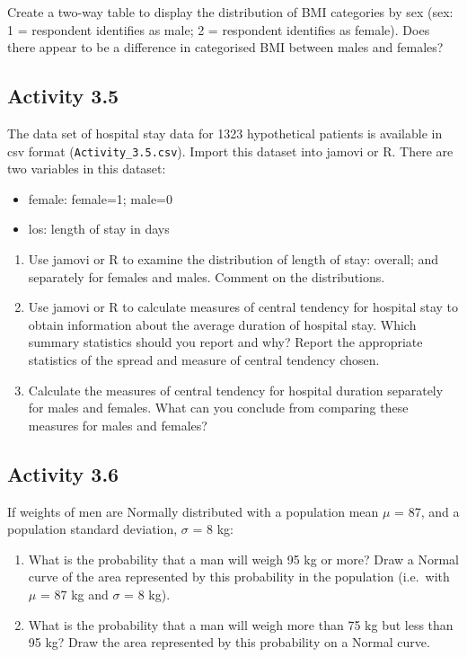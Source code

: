 \documentclass[
  a4paper,
]{memoir}
\providecommand{\tightlist}{%
  \setlength{\itemsep}{0pt}\setlength{\parskip}{0pt}}
\begin{document}
Create a two-way table to display the distribution of BMI categories by
sex (sex: 1 = respondent identifies as male; 2 = respondent identifies
as female). Does there appear to be a difference in categorised BMI
between males and females?

\subsection*{Activity 3.5}\label{activity-3.5}

The data set of hospital stay data for 1323 hypothetical patients is
available in csv format (\texttt{Activity\_3.5.csv}). Import this
dataset into jamovi or R. There are two variables in this dataset:

\begin{itemize}
\tightlist
\item
  female: female=1; male=0
\item
  los: length of stay in days
\end{itemize}

\begin{enumerate}
\def\labelenumi{\alph{enumi})}
\tightlist
\item
  Use jamovi or R to examine the distribution of length of stay:
  overall; and separately for females and males. Comment on the
  distributions.
\item
  Use jamovi or R to calculate measures of central tendency for hospital
  stay to obtain information about the average duration of hospital
  stay. Which summary statistics should you report and why? Report the
  appropriate statistics of the spread and measure of central tendency
  chosen.
\item
  Calculate the measures of central tendency for hospital duration
  separately for males and females. What can you conclude from comparing
  these measures for males and females?
\end{enumerate}

\subsection*{Activity 3.6}\label{activity-3.6}

If weights of men are Normally distributed with a population mean
\(\mu\) = 87, and a population standard deviation, \(\sigma\) = 8 kg:

\begin{enumerate}
\def\labelenumi{\alph{enumi})}
\tightlist
\item
  What is the probability that a man will weigh 95 kg or more? Draw a
  Normal curve of the area represented by this probability in the
  population (i.e.~with \(\mu\) = 87 kg and \(\sigma\) = 8 kg).
\item
  What is the probability that a man will weigh more than 75 kg but less
  than 95 kg? Draw the area represented by this probability on a Normal
  curve.
\end{enumerate}
\end{document}
